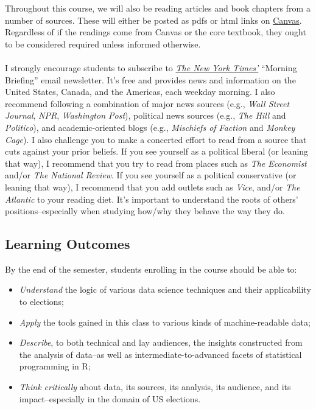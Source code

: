 \documentclass[11pt]{article}
\def\doubleq#1{``#1''}
\begin{document}
Throughout this course, we will also be reading articles and book chapters from a number of sources. These will either be posted as pdfs or html links on {\href{http://ufl.instructure.com/}{Canvas}}. Regardless of if the readings come from Canvas or the core textbook, they ought to be considered required unless informed otherwise. 
\\\\
I strongly encourage students to subscribe to \textit{{\href{https://www.nytimes.com/newsletters}{The New York Times'}}} \doubleq{Morning Briefing} email newsletter. It's free and provides news and information on the United States, Canada, and the Americas, each weekday morning. I also recommend following a combination of major news sources (e.g., \textit{Wall Street Journal}, \textit{NPR}, \textit{Washington Post}), political news sources (e.g., \textit{The Hill} and \textit{Politico}), and academic-oriented blogs (e.g., \textit{Mischiefs of Faction} and \textit{Monkey Cage}). I also challenge you to make a concerted effort to read from a source that cuts against your prior beliefs. If you see yourself as a political liberal (or leaning that way), I recommend that you try to read from places such as \textit{The Economist} and/or \textit{The National Review}. If you see yourself as a political conservative (or leaning that way), I recommend that you add outlets such as \textit{Vice}, and/or \textit{The Atlantic} to your reading diet. It's important to understand the roots of others' positions--especially when studying how/why they behave the way they do.

\subsection{Learning Outcomes} 
By the end of the semester, students enrolling in the course should be able to:
\begin{itemize}
\item \textit{Understand} the logic of various data science techniques and their applicability to elections;
\item \textit{Apply} the tools gained in this class to various kinds of machine-readable data;
\item \textit{Describe}, to both technical and lay audiences, the insights constructed from the analysis of data--as well as intermediate-to-advanced facets of statistical programming in R; 
\item \textit{Think critically} about data, its sources, its analysis, its audience, and its impact--especially in the domain of US elections. 
\end{itemize}
\end{document}

